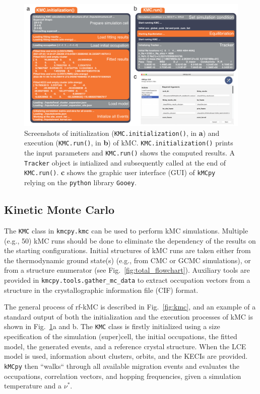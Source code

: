 \documentclass[a4paper,fleqn]{cas-dc}
\begin{document}
{\begin{figure}[!ht]
    \centering
    \includegraphics[width=1\textwidth]{Figures/output.pdf}
    \caption{Screenshots of initialization (\texttt{KMC.initialization()}, in {\bf a}) and  execution (\texttt{KMC.run()}, in {\bf b}) of kMC. \texttt{KMC.initialization()} prints the input parameters and \texttt{KMC.run()} shows the computed results. A \texttt{Tracker} object is intialized and subsequently called at the end of \texttt{KMC.run()}. {\bf c} shows the graphic user interface (GUI) of {\texttt{kMCpy}} relying on the \texttt{python} library {\texttt{Gooey}}.}  
    \label{fig:io}
\end{figure}

\subsection{Kinetic Monte Carlo}\label{sec:kmc}
\noindent The \texttt{KMC} class in \texttt{kmcpy.kmc} can be used to perform kMC simulations. Multiple (e.g., 50) kMC runs should be done to eliminate the dependency of the results on the starting configurations. Initial structures of kMC runs are taken either from the thermodynamic ground state(s) (e.g., from CMC or GCMC simulations), or from a structure enumerator (see Fig.~\ref{fig:total_flowchart}). Auxiliary tools are provided in \texttt{kmcpy.tools.gather\_mc\_data} to extract occupation vectors from a structure in the crystallographic information file (CIF) format. 

The general process of rf-kMC is described in Fig.~\ref{fig:kmc}, and an example of a standard output of both the initialization and the execution processes of kMC is shown in Fig.~\ref{fig:io}a and b. The \texttt{KMC} class is firstly initialized using a size specification of the simulation (super)cell, the initial occupations, the fitted model, the generated events, and a reference crystal structure. When the LCE model is used, information about clusters, orbits, and the KECIs are provided. \texttt{kMCpy} then ``walks`` through all available migration events and evaluates the occupations, correlation vectors, and hopping frequencies, given a simulation temperature and a $\nu^{*}$. 

}
\end{document}
